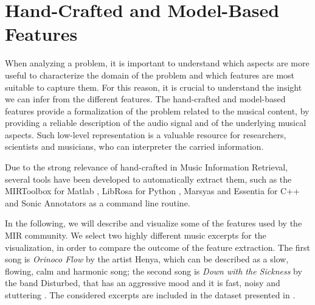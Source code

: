 \section{Hand-Crafted and Model-Based Features}\label{sec:LLFs:hand-crafted}
When analyzing a problem, it is important to understand which aspects are more useful to characterize the domain of the problem and which features are most suitable to capture them. For this reason, it is crucial to understand the insight we can infer from the different features. The hand-crafted and model-based features provide a formalization of the problem related to the musical content, by providing a reliable description of the audio signal and of the underlying musical aspects. Such low-level representation is a valuable resource for   %
researchers, scientists and musicians, who can interpreter the carried information.  

Due to the strong relevance of hand-crafted in Music Information Retrieval, several tools have been developed to automatically extract them, such as the MIRToolbox for Matlab \cite{Lartillot2007}, LibRosa for Python  \cite{brian_mcfee_2015_18369}, Marsyas \cite{tzanetakis2000marsyas} and Essentia\cite{bogdanov2013essentia} for C++ and Sonic Annotators \cite{chris2010a} as a command line routine. 


In the following, we will describe and visualize some of the features used by the MIR community. We select two highly different music excerpts for the visualization, in order to compare the outcome of the feature extraction. The first song is \textit{Orinoco Flow} by the artist Henya, which can be described as a slow, flowing, calm and harmonic song; the second song is \textit{Down with the Sickness} by the band Disturbed, that has an aggressive mood and it is fast, noisy and stuttering \cite{Buccoli2013}. The considered excerpts are included in the dataset presented in \cite{kim2008moodswings}.

